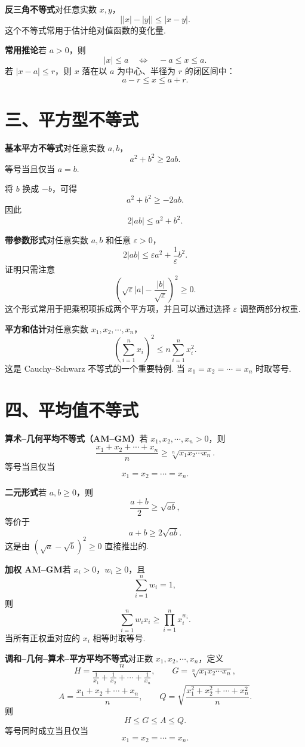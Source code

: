 \documentclass[UTF8,12pt,a4paper,fontset=fandol]{ctexart}
\begin{document}
\noindent\textbf{反三角不等式}\quad 对任意实数 $x,y$，
\[
  \bigl||x|-|y|\bigr|\le |x-y|.
\]
这个不等式常用于估计绝对值函数的变化量.

\noindent\textbf{常用推论}\quad 若 $a>0$，则
\[
  |x|\le a
  \quad\Longleftrightarrow\quad
  -a\le x\le a.
\]
若 $|x-a|\le r$，则 $x$ 落在以 $a$ 为中心、半径为 $r$ 的闭区间中：
\[
  a-r\le x\le a+r.
\]

\section*{三、平方型不等式}

\noindent\textbf{基本平方不等式}\quad 对任意实数 $a,b$，
\[
  a^2+b^2\ge2ab.
\]
等号当且仅当 $a=b$.

将 $b$ 换成 $-b$，可得
\[
  a^2+b^2\ge -2ab.
\]
因此
\[
  2|ab|\le a^2+b^2.
\]

\noindent\textbf{带参数形式}\quad 对任意实数 $a,b$ 和任意 $\varepsilon>0$，
\[
  2|ab|\le \varepsilon a^2+\frac{1}{\varepsilon}b^2.
\]
证明只需注意
\[
  \left(\sqrt{\varepsilon}|a|-\frac{|b|}{\sqrt{\varepsilon}}\right)^2\ge0.
\]
这个形式常用于把乘积项拆成两个平方项，并且可以通过选择 $\varepsilon$ 调整两部分权重.

\noindent\textbf{平方和估计}\quad 对任意实数 $x_1,x_2,\cdots,x_n$，
\[
  \left(\sum_{i=1}^n x_i\right)^2
  \le
  n\sum_{i=1}^n x_i^2.
\]
这是 Cauchy--Schwarz 不等式的一个重要特例. 当 $x_1=x_2=\cdots=x_n$ 时取等号.

\section*{四、平均值不等式}

\noindent\textbf{算术--几何平均不等式（AM--GM）}\quad 若 $x_1,x_2,\cdots,x_n>0$，则
\[
  \frac{x_1+x_2+\cdots+x_n}{n}
  \ge
  \sqrt[n]{x_1x_2\cdots x_n}.
\]
等号当且仅当
\[
  x_1=x_2=\cdots=x_n.
\]

\noindent\textbf{二元形式}\quad 若 $a,b\ge0$，则
\[
  \frac{a+b}{2}\ge\sqrt{ab},
\]
等价于
\[
  a+b\ge2\sqrt{ab}.
\]
这是由 $(\sqrt a-\sqrt b)^2\ge0$ 直接推出的.

\noindent\textbf{加权 AM--GM}\quad 若 $x_i>0$，$w_i\ge0$，且
\[
  \sum_{i=1}^n w_i=1,
\]
则
\[
  \sum_{i=1}^n w_i x_i
  \ge
  \prod_{i=1}^n x_i^{w_i}.
\]
当所有正权重对应的 $x_i$ 相等时取等号.

\noindent\textbf{调和--几何--算术--平方平均不等式}\quad 对正数 $x_1,x_2,\cdots,x_n$，定义
\[
  H=\frac{n}{\frac1{x_1}+\frac1{x_2}+\cdots+\frac1{x_n}},
  \qquad
  G=\sqrt[n]{x_1x_2\cdots x_n},
\]
\[
  A=\frac{x_1+x_2+\cdots+x_n}{n},
  \qquad
  Q=\sqrt{\frac{x_1^2+x_2^2+\cdots+x_n^2}{n}}.
\]
则
\[
  H\le G\le A\le Q.
\]
等号同时成立当且仅当
\[
  x_1=x_2=\cdots=x_n.
\]
\end{document}
